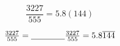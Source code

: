\documentclass{article}
\newcommand{\wideunderline}[2][2em]{%
  \underline{\makebox[\ifdim\width>#1\width\else#1\fi]{#2}}%
}
\begin{document}
$$\frac{3227}{555} = 5.8(144)$$

\begin{equation} 

$$\frac{3227}{555} = \wideunderline[4em]{} $$

$$\frac{3227}{555} = 5.8 \overline {144}$$

\end{equation} 
\end{document}
